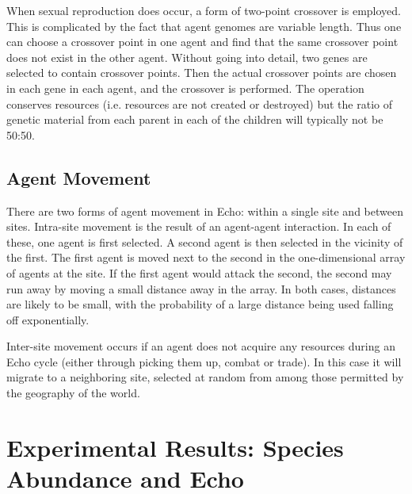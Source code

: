 When sexual reproduction does occur, a form of two-point crossover is
employed. This is complicated by the fact that agent genomes are
variable length. Thus one can choose a crossover point in one agent
and find that the same crossover point does not exist in the other
agent.  Without going into detail, two genes are selected to contain
crossover points.  Then the actual crossover points are chosen in each
gene in each agent, and the crossover is performed. The operation
conserves resources (i.e. resources are not created or destroyed) but
the ratio of genetic material from each parent in each of the children
will typically not be 50:50.

%
%
%

\subsection{Agent Movement}

There are two forms of agent movement in Echo: within a single site
and between sites. Intra-site movement is the result of an
agent-agent interaction.  In each of these, one agent is first
selected.  A second agent is then selected in the vicinity of the
first. The first agent is moved next to the second in the
one-dimensional array of agents at the site. If the first agent would
attack the second, the second may run away by moving a small distance
away in the array. In both cases, distances are likely to be small,
with the probability of a large distance being used falling off
exponentially.

Inter-site movement occurs if an agent does not acquire any resources
during an Echo cycle (either through picking them up, combat or
trade). In this case it will migrate to a neighboring site, selected
at random from among those permitted by the geography of the world.

\section{Experimental Results: Species Abundance and Echo}

